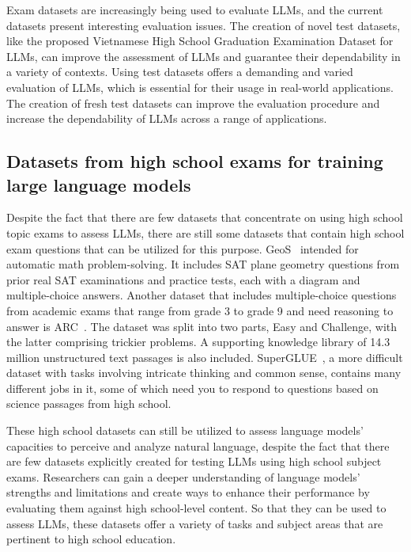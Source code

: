 \documentclass{article}
\begin{document}
{	Exam datasets are increasingly being used to evaluate LLMs, and the current datasets present interesting evaluation issues. The creation of novel test datasets, like the proposed Vietnamese High School Graduation Examination Dataset for LLMs, can improve the assessment of LLMs and guarantee their dependability in a variety of contexts. Using test datasets offers a demanding and varied evaluation of LLMs, which is essential for their usage in real-world applications. The creation of fresh test datasets can improve the evaluation procedure and increase the dependability of LLMs across a range of applications.
	
	\subsection{Datasets from high school exams for training large language models}
	
	Despite the fact that there are few datasets that concentrate on using high school topic exams to assess LLMs, there are still some datasets that contain high school exam questions that can be utilized for this purpose. GeoS~\cite{seo2015solving} intended for automatic math problem-solving. It includes SAT plane geometry questions from prior real SAT examinations and practice tests, each with a diagram and multiple-choice answers. Another dataset that includes multiple-choice questions from academic exams that range from grade 3 to grade 9 and need reasoning to answer is ARC~\cite{clark2018think}. The dataset was split into two parts, Easy and Challenge, with the latter comprising trickier problems. A supporting knowledge library of 14.3 million unstructured text passages is also included. SuperGLUE~\cite{wang2019superglue}, a more difficult dataset with tasks involving intricate thinking and common sense, contains many different jobs in it, some of which need you to respond to questions based on science passages from high school.  
	
	These high school datasets can still be utilized to assess language models' capacities to perceive and analyze natural language, despite the fact that there are few datasets explicitly created for testing LLMs using high school subject exams. Researchers can gain a deeper understanding of language models' strengths and limitations and create ways to enhance their performance by evaluating them against high school-level content. So that they can be used to assess LLMs, these datasets offer a variety of tasks and subject areas that are pertinent to high school education.
	
}
\end{document}
